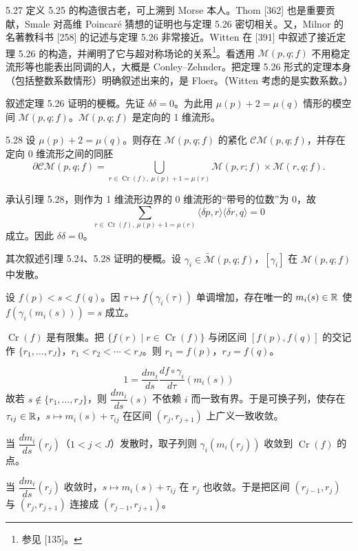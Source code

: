 \begin{remark}{5.27}
  定义 5.25 的构造很古老，可上溯到 Morse 本人。Thom [362] 也是重要贡献，Smale 对高维 Poincaré 猜想的证明也与定理 5.26 密切相关。又，Milnor 的名著教科书 [258] 的记述与定理 5.26 非常接近。Witten 在 [391] 中叙述了接近定理 5.26 的构造，并阐明了它与超对称场论的关系\footnote{参见 [135]。}。看透用 $\mathcal{M}(p,q;f)$ 不用稳定流形等也能表出同调的人，大概是 Conley–Zehnder。把定理 5.26 形式的定理本身（包括整数系数情形）明确叙述出来的，是 Floer。（Witten 考虑的是实数系数。）
\end{remark}

叙述定理 5.26 证明的梗概。先证 $\delta\delta=0$。为此用 $\mu(p)+2=\mu(q)$ 情形的模空间 $\mathcal{M}(p,q;f)$。$\mathcal{M}(p,q;f)$ 是定向的 1 维流形。

\begin{lemma}{5.28}
  设 $\mu(p)+2=\mu(q)$。则存在 $\mathcal{M}(p,q;f)$ 的紧化 $\mathcal{CM}(p,q;f)$，并存在定向 0 维流形之间的同胚
  \[
    \partial\mathcal{CM}(p,q;f)=\bigcup_{r\in\operatorname{Cr}(f),\ \mu(p)+1=\mu(r)}\mathcal{M}(p,r;f)\times\mathcal{M}(r,q;f).
  \]
\end{lemma}

承认引理 5.28，则作为 1 维流形边界的 0 维流形的“带号的位数”为 0，故
\[
  \sum_{r\in\operatorname{Cr}(f),\ \mu(p)+1=\mu(r)}\langle\delta p,r\rangle\langle\delta r,q\rangle=0
\]
成立。因此 $\delta\delta=0$。

其次叙述引理 5.24、5.28 证明的梗概。设 $\gamma_i\in\tilde{\mathcal{M}}(p,q;f)$，$[\gamma_i]$ 在 $\mathcal{M}(p,q;f)$ 中发散。

设 $f(p)<s<f(q)$。因 $\tau\mapsto f(\gamma_i(\tau))$ 单调增加，存在唯一的 $m_i(s)\in\mathbb{R}$ 使 $f(\gamma_i(m_i(s)))=s$ 成立。

$\operatorname{Cr}(f)$ 是有限集。把 $\{f(r)\mid r\in\operatorname{Cr}(f)\}$ 与闭区间 $[f(p),f(q)]$ 的交记作 $\{r_1,\dots,r_J\}$，$r_1<r_2<\cdots<r_J$。则 $r_1=f(p)$，$r_J=f(q)$。

\[
  1=\frac{dm_i}{ds}\frac{df\circ\gamma_i}{d\tau}(m_i(s))
\]
故若 $s\notin\{r_1,\dots,r_J\}$，则 $\dfrac{dm_i}{ds}(s)$ 不依赖 $i$ 而一致有界。于是可换子列，使存在 $\tau_{ij}\in\mathbb{R}$，$s\mapsto m_i(s)+\tau_{ij}$ 在区间 $(r_j,r_{j+1})$ 上广义一致收敛。

当 $\dfrac{dm_i}{ds}(r_j)$（$1<j<J$）发散时，取子列则 $\gamma_i(m_i(r_j))$ 收敛到 $\operatorname{Cr}(f)$ 的点。

当 $\dfrac{dm_i}{ds}(r_j)$ 收敛时，$s\mapsto m_i(s)+\tau_{ij}$ 在 $r_j$ 也收敛。于是把区间 $(r_{j-1},r_j)$ 与 $(r_j,r_{j+1})$ 连接成 $(r_{j-1},r_{j+1})$。

